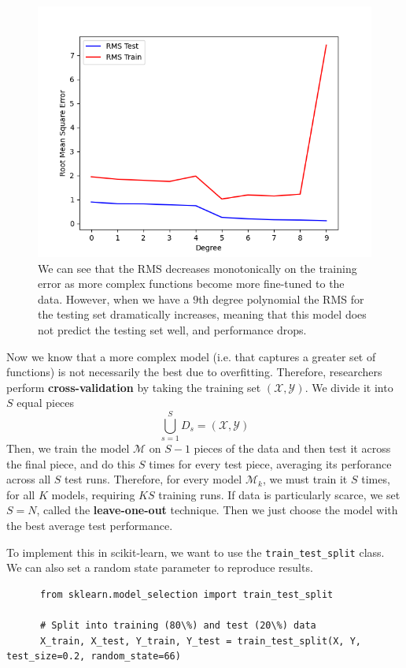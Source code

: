   \begin{figure}[H]
    \centering
    \includegraphics[scale=0.4]{img/Degree_vs_RMS.png}
    \caption{We can see that the RMS decreases monotonically on the training error as more complex functions become more fine-tuned to the data. However, when we have a $9$th degree polynomial the RMS for the testing set dramatically increases, meaning that this model does not predict the testing set well, and performance drops. }
    \label{fig:poly_deg_vs_rms}
  \end{figure}

  Now we know that a more complex model (i.e. that captures a greater set of functions) is not necessarily the best due to overfitting. Therefore, researchers perform \textbf{cross-validation} by taking the training set $(\mathcal{X}, \mathcal{Y})$. We divide it into $S$ equal pieces 
  \begin{equation}
    \bigcup_{s=1}^S D_s = (\mathcal{X}, \mathcal{Y})
  \end{equation}
  Then, we train the model $\mathcal{M}$ on $S-1$ pieces of the data and then test it across the final piece, and do this $S$ times for every test piece, averaging its perforance across all $S$ test runs. Therefore, for every model $\mathcal{M}_k$, we must train it $S$ times, for all $K$ models, requiring $KS$ training runs. If data is particularly scarce, we set $S = N$, called the \textbf{leave-one-out} technique. Then we just choose the model with the best average test performance. 

  \begin{code}
    To implement this in scikit-learn, we want to use the \texttt{train\_test\_split} class. We can also set a random state parameter to reproduce results. 
    \begin{lstlisting}
      from sklearn.model_selection import train_test_split 

      # Split into training (80\%) and test (20\%) data 
      X_train, X_test, Y_train, Y_test = train_test_split(X, Y, test_size=0.2, random_state=66)
    \end{lstlisting}
  \end{code}

